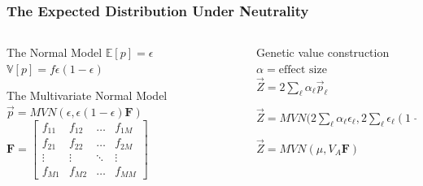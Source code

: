 \documentclass{beamer}
\begin{document}
\begin{frame}
	\frametitle	{The Expected Distribution Under Neutrality}
	\begin{columns}
		\begin{column}{0.48 \textwidth}

					\begin{block}{The Normal Model}
						$\mathbb{E}\left[p\right] = \epsilon$ \\
						\vskip 0.4cm
						$\mathbb{V}\left[p\right] = f \epsilon ( 1 - \epsilon )$
					\end{block}

\begin{block}{The Multivariate Normal Model}	
	$\vec{p}  =  MVN(\epsilon,  \epsilon ( 1 - \epsilon ) \mathbf{F})$ \\

		$\mathbf{F} = \begin{bmatrix}
							f_{11}&f_{12}&\dots& f_{1M} \\
							f_{21}&f_{22}&\dots& f_{2M} \\
							\vdots& \vdots& \ddots& \vdots \\
							f_{M1}& f_{M2}& \dots& f_{MM}
					\end{bmatrix}$

\end{block}

		\end{column}
		\begin{column}{0.48\textwidth}


\vskip 0.5cm
	\begin{block}{Genetic value construction}
						$\alpha = \text{effect size}$ \\
						$\vec{Z} = 2\sum_\ell \alpha_\ell \vec{p}_{\ell}$
					\end{block}
\vskip 0.5cm

	\begin{block}

						$\vec{Z} =
                                                MVN \big( 2\sum_{\ell}
                                                \alpha_\ell
                                                \epsilon_{\ell},2\sum_{\ell}
                                                \epsilon_{\ell} ( 1 -
                                                \epsilon_{\ell} )
                                                \mathbf{F} \big)$

						$\vec{Z} =
                                                MVN(\mu, V_A \mathbf{F})$

					\end{block}
					
		\end{column}
	\end{columns}
\end{frame}
\end{document}

